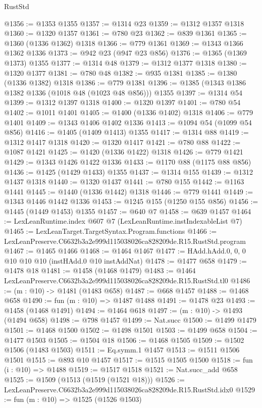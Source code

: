 \begin{lexlean}{RustStd}
\begin{coremodule}
@1356 := @1353 @1355
@1357 := @1314 @23
@1359 := @1312 @1357 @1318
@1360 := @1320 @1357
@1361 := @780 @23
@1362 := @839 @1361
@1365 := @1360 (@1336 @1362) @1318
@1366 := @779 @1361
@1369 := @1343 @1366 @1362 @1336
@1373 := @942 @23 (@947 @23 @856)
@1376 := @1365 (@1369 @1373) @1355
@1377 := @1314 @48
@1379 := @1312 @1377 @1318
@1380 := @1320 @1377
@1381 := @780 @48
@1382 := @935 @1381
@1385 := @1380 (@1336 @1382) @1318
@1386 := @779 @1381
@1396 := @1385 (@1343 @1386 @1382 @1336 (@1018 @48 (@1023 @48 @856))) @1355
@1397 := @1314 @54
@1399 := @1312 @1397 @1318
@1400 := @1320 @1397
@1401 := @780 @54
@1402 := @1011 @1401
@1405 := @1400 (@1336 @1402) @1318
@1406 := @779 @1401
@1409 := @1343 @1406 @1402 @1336
@1413 := @1094 @54 (@1099 @54 @856)
@1416 := @1405 (@1409 @1413) @1355
@1417 := @1314 @88
@1419 := @1312 @1417 @1318
@1420 := @1320 @1417
@1421 := @780 @88
@1422 := @1087 @1421
@1425 := @1420 (@1336 @1422) @1318
@1426 := @779 @1421
@1429 := @1343 @1426 @1422 @1336
@1433 := @1170 @88 (@1175 @88 @856)
@1436 := @1425 (@1429 @1433) @1355
@1437 := @1314 @155
@1439 := @1312 @1437 @1318
@1440 := @1320 @1437
@1441 := @780 @155
@1442 := @1163 @1441
@1445 := @1440 (@1336 @1442) @1318
@1446 := @779 @1441
@1449 := @1343 @1446 @1442 @1336
@1453 := @1245 @155 (@1250 @155 @856)
@1456 := @1445 (@1449 @1453) @1355
@1457 := @640 @7
@1458 := @639 @1457
@1464 := LexLeanRuntime.index @607 @7 (LexLeanRuntime.instIndexableList @7)
@1465 := LexLeanTarget.TargetSyntax.Program.functions
@1466 := LexLeanPreserve.C6632b3a2e999d115038026ca828209de.R15.RustStd.program
@1467 := @1465 @1466
@1468 := @1464 @1467
@1477 := HAdd.hAdd.{0, 0, 0} @10 @10 @10 (instHAdd.{0} @10 instAddNat)
@1478 := @1477 @658
@1479 := @1478 @18
@1481 := @1458 (@1468 @1479)
@1483 := @1464 LexLeanPreserve.C6632b3a2e999d115038026ca828209de.R15.RustStd.tl0
@1486 := (m : @10) -> @1481 (@1483 @658)
@1487 := @668 @1457
@1488 := @1468 @658
@1490 := fun (m : @10) => @1487 @1488
@1491 := @1478 @23
@1493 := @1458 (@1468 @1491)
@1494 := @1464 @618
@1497 := (m : @10) -> @1493 (@1494 @658)
@1498 := @798 @1457
@1499 := Nat.succ
@1500 := @1499 @1479
@1501 := @1468 @1500
@1502 := @1498 @1501
@1503 := @1499 @658
@1504 := @1477 @1503
@1505 := @1504 @18
@1506 := @1468 @1505
@1509 := @1502 @1506 (@1483 @1503)
@1511 := Eq.symm.{1} @1457
@1513 := @1511 @1506 @1501
@1515 := @893 @10 @1457
@1517 := @1515 @1505 @1500
@1518 := fun (i : @10) => @1488
@1519 := @1517 @1518
@1521 := Nat.succ_add @658
@1525 := @1509 (@1513 (@1519 (@1521 @18)))
@1526 := LexLeanPreserve.C6632b3a2e999d115038026ca828209de.R15.RustStd.idx0
@1529 := fun (m : @10) => @1525 (@1526 @1503)

\end{coremodule}
\end{lexlean}
